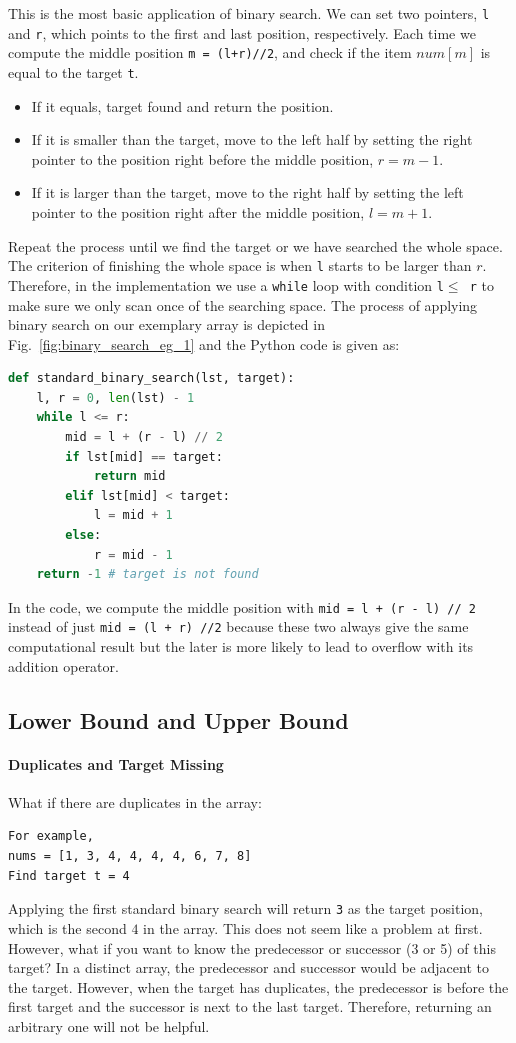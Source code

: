 \documentclass[main.tex]{subfiles}
\begin{document}
This is the most basic application of binary search. We can set two pointers, \texttt{l} and \texttt{r}, which points to the first and last position, respectively. Each time we compute the middle position \texttt{m = (l+r)//2}, and check if the item $num[m]$ is equal to the target \texttt{t}. 
\begin{itemize}
\item If it equals, target found and return the position. 
\item If it is smaller than the target, move to the left half by setting the right pointer to the position right before the middle position, $r = m - 1$. 
\item If it is larger than the target, move to the right half by setting the left pointer to the position right after the middle position, $l = m + 1$. 
\end{itemize}
Repeat the process until we find the target or we have searched the whole space. The criterion of finishing the whole space is when \texttt{l} starts to be larger than $r$. Therefore, in the implementation we use a \texttt{while} loop with condition \texttt{l$\leq$ r} to make sure we only scan once of the searching space. The process of applying binary search on our exemplary array is depicted in Fig.~\ref{fig:binary_search_eg_1} and the Python code is given as:
\begin{lstlisting}[language=Python]
def standard_binary_search(lst, target):
    l, r = 0, len(lst) - 1
    while l <= r:
        mid = l + (r - l) // 2
        if lst[mid] == target:
            return mid
        elif lst[mid] < target:
            l = mid + 1
        else:
            r = mid - 1
    return -1 # target is not found 
\end{lstlisting}
In the code, we compute the middle position with \texttt{mid = l + (r - l) // 2} instead of just \texttt{mid = (l + r) //2} because these two always give the same computational result but the later is more likely to lead to overflow with its addition operator.

\subsection{Lower Bound and Upper Bound}
\paragraph{Duplicates and Target Missing} What if there are duplicates in the array:
\begin{lstlisting}[numbers=none]
For example, 
nums = [1, 3, 4, 4, 4, 4, 6, 7, 8]
Find target t = 4
\end{lstlisting}
Applying the first standard binary search will return \texttt{3} as the target position, which is the second $4$ in the array. This does not seem like a problem at first. However, what if you want to know the predecessor or successor (3 or 5) of this target? In a distinct array, the predecessor and successor would be adjacent to the target. However, when the target has duplicates, the predecessor is  before the first target and the successor is next to the last target. Therefore, returning an arbitrary one will not be helpful. 
\end{document}
